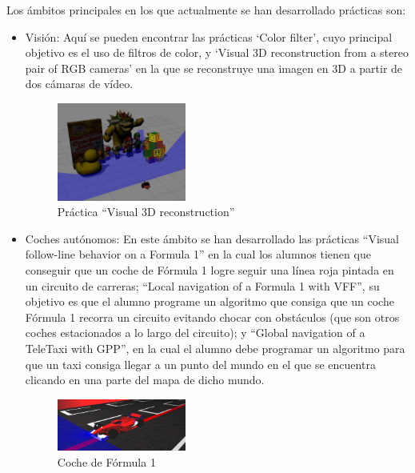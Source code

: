 Los ámbitos principales en los que actualmente se han desarrollado prácticas son:
\begin{itemize}
	\item Visión: Aquí se pueden encontrar las prácticas ‘Color filter’, cuyo principal objetivo es el uso de filtros de color, y ‘Visual 3D reconstruction from a stereo pair of RGB cameras’ en la que se reconstruye una imagen en 3D a partir de dos cámaras de vídeo.
	\begin{figure}[H]
  	\begin{center}
    	\includegraphics[width=0.4\textwidth]{figures/Introduccion/vision.jpg}
			\caption{Práctica ``Visual 3D reconstruction''}
			\label{fig.vision}
			\end{center}
	\end{figure}

	\item Coches autónomos: En este ámbito se han desarrollado las prácticas ``Visual follow-line behavior on a Formula 1'' en la cual los alumnos tienen que conseguir que un coche de Fórmula 1 logre seguir una línea roja pintada en un circuito de carreras; ``Local navigation of a Formula 1 with VFF'', su objetivo es que el alumno programe un algoritmo que consiga que un coche Fórmula 1 recorra un circuito evitando chocar con obstáculos (que son otros coches estacionados a lo largo del circuito); y ``Global navigation of a TeleTaxi with GPP'', en la cual el alumno debe programar un algoritmo para que un taxi consiga llegar a un punto del mundo en el que se encuentra clicando en una parte del mapa de dicho mundo.
	\begin{figure}[H]
  	\begin{center}
    	\includegraphics[width=0.4\textwidth]{figures/Introduccion/f1.jpg}
			\caption{Coche de Fórmula 1}
			\label{fig.f1}
			\end{center}
	\end{figure}


\end{itemize}
